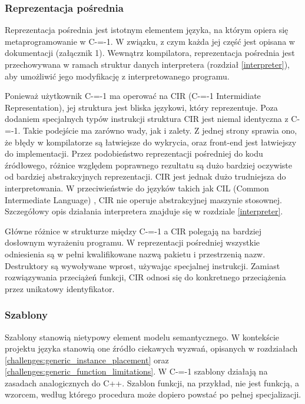 \subsubsection{Reprezentacja pośrednia}
\label{implementation:intermidiate_representation}
Reprezentacja pośrednia jest istotnym elementem języka, na którym opiera się metaprogramowanie w C-=-1.
W związku, z czym każda jej część jest opisana w dokumentacji (załącznik 1).
Wewnątrz kompilatora, reprezentacja pośrednia jest przechowywana w ramach struktur danych interpretera (rozdział \ref{interpreter}), aby umożliwić jego modyfikację z interpretowanego programu.

Ponieważ użytkownik C-=-1 ma operować na CIR (C-=-1 Intermidiate Representation), jej struktura jest bliska językowi, który reprezentuje. 
Poza dodaniem specjalnych typów instrukcji struktura CIR jest niemal identyczna z C-=-1.
Takie podejście ma zarówno wady, jak i zalety. 
Z jednej strony sprawia ono, że błędy w kompilatorze są łatwiejsze do wykrycia, oraz front-end jest łatwiejszy do implementacji.
Przez podobieństwo reprezentacji pośredniej do kodu źródłowego, różnice względem poprawnego rezultatu są dużo bardziej oczywiste od bardziej abstrakcyjnych reprezentacji.
CIR jest jednak dużo trudniejsza do interpretowania.
W przeciwieństwie do języków takich jak CIL (Common Intermediate Language) \cite{ecma:cli}, CIR nie operuje abstrakcyjnej maszynie stosownej.
Szczegółowy opis działania interpretera znajduje się w rozdziale \ref{interpreter}.

Główne różnice w strukturze między C-=-1 a CIR polegają na bardziej dosłownym wyrażeniu programu. W reprezentacji pośredniej wszystkie odniesienia są w pełni kwalifikowane nazwą pakietu i przestrzenią nazw. Destruktory są wywoływane wprost, używając specjalnej instrukcji. Zamiast rozwiązywania przeciążeń funkcji, CIR odnosi się do konkretnego przeciążenia przez unikatowy identyfikator.

\subsubsection{Szablony}
\label{implementation:generics}
Szablony stanowią nietypowy element modelu semantycznego.
W kontekście projektu języka stanowią one źródło ciekawych wyzwań, opisanych w rozdziałach \ref{challenges:generic_instance_placement} oraz \ref{challenges:generic_function_limitations}.
W C-=-1 szablony działają na zasadach analogicznych do C++.
Szablon funkcji, na przykład, nie jest funkcją, a wzorcem, według którego procedura może dopiero powstać po pełnej specjalizacji.


